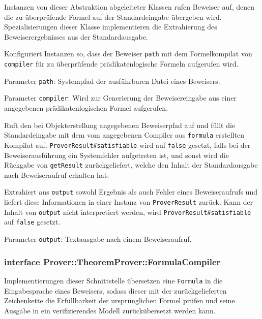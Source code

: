 Instanzen von dieser Abstraktion abgeleiteter Klassen rufen Beweiser
auf, denen die zu überprüfende Formel auf der Standardeingabe
übergeben wird. Spezialisierungen dieser Klasse implementieren die
Extrahierung des Beweiserergebnisses aus der Standardausgabe.%

\begin{description}%

    Konfiguriert Instanzen so, dass der Beweiser \texttt{path} mit dem
    Formelkompilat von \texttt{compiler} für zu überprüfende
    prädikatenlogische Formeln aufgerufen wird.%

    Parameter \texttt{path}: Systempfad der ausführbaren Datei eines
    Beweisers.%

    Parameter \texttt{compiler}: Wird zur Generierung der
    Beweisereingabe aus einer angegebenen prädikatenlogischen Formel
    aufgerufen.%


    Ruft den bei Objekterstellung angegebenen Beweiserpfad auf und
    füllt die Standardeingabe mit dem vom angegebenen Compiler aus
    \texttt{formula} erstellten Kompilat auf.
    \texttt{ProverResult\#satisfiable} wird auf \texttt{false}
    gesetzt, falls bei der Beweiserausführung ein Systemfehler
    aufgetreten ist, und sonst wird die Rückgabe von
    \texttt{getResult} zurückgeliefert, welche den Inhalt der
    Standardausgabe nach Beweiseraufruf erhalten hat.%


    Extrahiert aus \texttt{output} sowohl Ergebnis als auch Fehler
    eines Beweiseraufrufs und liefert diese Informationen in einer
    Instanz von \texttt{ProverResult} zurück. Kann der Inhalt von
    \texttt{output} nicht interpretiert werden, wird
    \texttt{ProverResult\#satisfiable} auf \texttt{false} gesetzt.%

    Parameter \texttt{output}: Textausgabe nach einem Beweiseraufruf.%

\end{description}%

\subsubsection{interface Prover::TheoremProver::FormulaCompiler}%

Implementierungen dieser Schnittstelle übersetzen eine
\texttt{Formula} in die Eingabesprache eines Beweisers, sodass dieser
mit der zurückgelieferten Zeichenkette die Erfüllbarkeit der
ursprünglichen Formel prüfen und seine Ausgabe in ein verifizierendes
Modell zurückübersetzt werden kann.%


